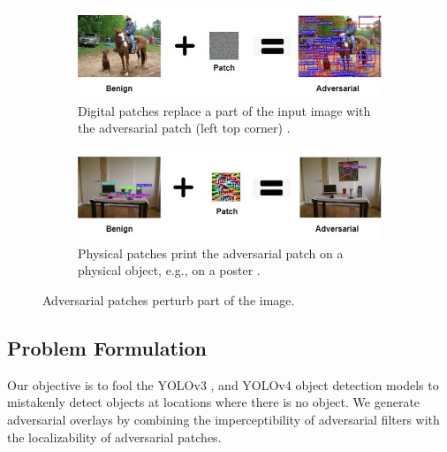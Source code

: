 \begin{figure}[H]
    \centering
    \begin{subfigure}[b]{\textwidth}
        \includegraphics[width=\linewidth]{figures/chapter_detection/detection/digital_patch.jpg}
        \caption{Digital patches replace a part of the input image with the adversarial patch (left top corner) \citep{liu2018dpatch}.}
        \label{fig:digital_patch}
    \end{subfigure}
    \begin{subfigure}[b]{\textwidth}
        \includegraphics[width=\linewidth]{figures/chapter_detection/detection/physical_patch.jpg}
        \caption{Physical patches print the adversarial patch on a physical object, e.g., on a poster \citep{lee2019physical}.}
        \label{fig:physical_patch}
    \end{subfigure}
    \caption{Adversarial patches perturb part of the image.}
    \label{fig:patch}
\end{figure}


\subsection{Problem Formulation} 

Our objective is to fool the YOLOv3 \citep{redmon2018yolov3}, and YOLOv4 \citep{bochkovskiy2020yolov4} object detection models to mistakenly detect objects at locations where there is no object. We generate adversarial overlays by combining the imperceptibility of adversarial filters with the localizability of adversarial patches.

